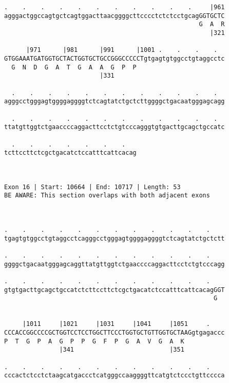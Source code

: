 \documentclass{article}
\begin{document}
\begin{Verbatim}
.    .    .    .    .    .    .    .    .    .    .     |961
agggactggccagtgctcagtggacttaacggggcttcccctctctcctgcagGGTGCTC
                                                     G  A  R
                                                        |321
  
      |971      |981      |991      |1001 .    .    .    .  
GTGGAAATGATGGTGCTACTGGTGCTGCCGGGCCCCCTgtgagtgtggcctgtaggcctc
  G  N  D  G  A  T  G  A  A  G  P  P                        
                          |331                              
  
  .    .    .    .    .    .    .    .    .    .    .    .  
agggcctgggagtggggaggggtctcagtatctgctcttggggctgacaatgggagcagg
                                                            
  .    .    .    .    .    .    .    .    .    .    .    .  
ttatgttggtctgaaccccaggacttcctctgtcccagggtgtgacttgcagctgccatc
                                                            
  .    .    .    .    .    .    .   
tcttccttctcgctgacatctccatttcattcacag
                                    
                                    
 
Exon 16 | Start: 10664 | End: 10717 | Length: 53
BE AWARE: This section overlaps with both adjacent exons



.    .    .    .    .    .    .    .    .    .    .    .    
tgagtgtggcctgtaggcctcagggcctgggagtggggaggggtctcagtatctgctctt
                                                            
.    .    .    .    .    .    .    .    .    .    .    .    
ggggctgacaatgggagcaggttatgttggtctgaaccccaggacttcctctgtcccagg
                                                            
.    .    .    .    .    .    .    .    .    .    .    .    
gtgtgacttgcagctgccatctcttccttctcgctgacatctccatttcattcacagGGT
                                                         G  
                                                            
  
     |1011     |1021     |1031     |1041     |1051     .    
CCCACCGGCCCCGCTGGTCCTCCTGGCTTCCCTGGTGCTGTTGGTGCTAAGgtgagaccc
P  T  G  P  A  G  P  P  G  F  P  G  A  V  G  A  K           
               |341                          |351           
  
.    .    .    .    .    .    .    .    .    .    .    .    
cccactctcctctaagcatgaccctcatgggccaaggggttcatgtctccctgttcccca
                                                            

\end{Verbatim}
\end{document}
